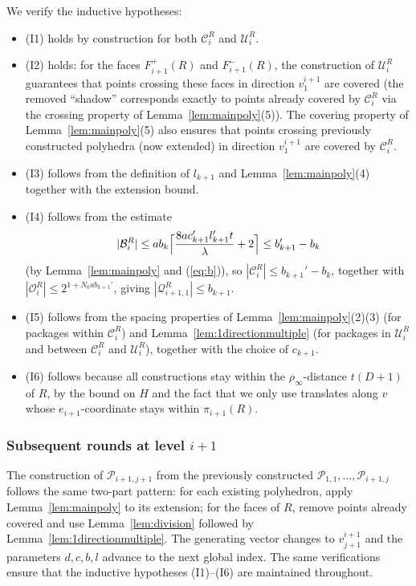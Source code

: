 \documentclass{amsart}
\theoremstyle{definition}
\begin{document}
We verify the inductive hypotheses:
\begin{itemize}
\item (I1) holds by construction for both $\mathcal{C}_i^R$ and
$\mathcal{U}_i^R$.
\item (I2) holds: for the faces $F_{i+1}^+(R)$ and $F_{i+1}^-(R)$, the
construction of $\mathcal{U}_i^R$ guarantees that points crossing these
faces in direction $v_1^{i+1}$ are covered (the removed ``shadow''
corresponds exactly to points already covered by $\mathcal{C}_i^R$ via the
crossing property of Lemma~\ref{lem:mainpoly}(5)). The covering property
of Lemma~\ref{lem:mainpoly}(5) also ensures that points crossing previously
constructed polyhedra (now extended) in direction $v_1^{i+1}$ are covered
by $\mathcal{C}_i^R$.
\item (I3) follows from the definition of $l_{k+1}$ and
Lemma~\ref{lem:mainpoly}(4) together with the extension bound.
\item (I4) follows from the estimate
\[
|\mathcal{B}_i^R| \leq a b_k
\Bigl\lceil \frac{8a c_{k+1}' l_{k+1}' t}{\lambda}+2 \Bigr\rceil
\leq b_{k+1}'-b_k
\]
(by Lemma~\ref{lem:mainpoly} and (\ref{eq:b})), so
$|\mathcal{C}_i^R| \leq b_{k+1}'-b_k$, together with
$|\mathcal{O}_i^R|\leq 2^{1+N_0ab_{k+1}'}$, giving
$|\mathcal{Q}_{i+1,1}^R|\leq b_{k+1}$.
\item (I5) follows from the spacing properties of
Lemma~\ref{lem:mainpoly}(2)(3) (for packages within $\mathcal{C}_i^R$) and
Lemma~\ref{lem:1directionmultiple} (for packages in $\mathcal{U}_i^R$ and
between $\mathcal{C}_i^R$ and $\mathcal{U}_i^R$), together with the choice
of $c_{k+1}$.
\item (I6) follows because all constructions stay within the
$\rho_\infty$-distance $t(D+1)$ of $R$, by the bound on $H$ and the fact
that we only use translates along $v$ whose $e_{i+1}$-coordinate stays
within $\pi_{i+1}(R)$.
\end{itemize}

\subsubsection{Subsequent rounds at level $i+1$}

The construction of $\mathcal{P}_{i+1,j+1}$ from the previously
constructed $\mathcal{P}_{1,1},\dots,\mathcal{P}_{i+1,j}$ follows the
same two-part pattern: for each existing polyhedron, apply
Lemma~\ref{lem:mainpoly} to its extension; for the faces of $R$, remove
points already covered and use Lemma~\ref{lem:division} followed by
Lemma~\ref{lem:1directionmultiple}. The generating vector changes to
$v_{j+1}^{i+1}$ and the parameters $d, c, b, l$ advance to the next
global index. The same verifications ensure that the inductive hypotheses
(I1)--(I6) are maintained throughout.
\end{document}
